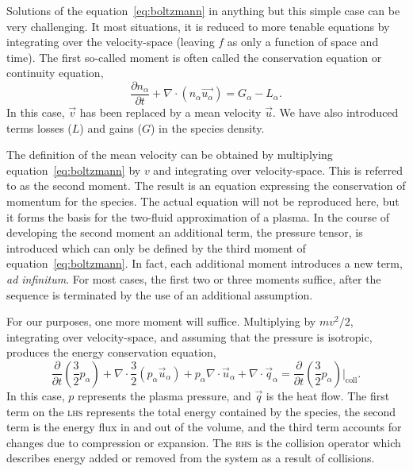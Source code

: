 Solutions of the equation~\ref{eq:boltzmann} in anything but this simple
case can be very challenging. It most situations, it is reduced to more
tenable equations by integrating over the velocity-space (leaving $f$ as
only a function of space and time). The first so-called moment is often
called the conservation equation or continuity equation,
\begin{equation}\label{eq:cont}
  \frac{\partial n_\alpha}{\partial t} + \nabla \cdot (n_\alpha \vec{u_\alpha})
  = G_\alpha - L_\alpha.
\end{equation}
In this case, $\vec{v}$ has been replaced by a mean velocity $\vec{u}$.
We have also introduced terms losses ($L$) and gains ($G$) in the
species density.

The definition of the mean velocity can be obtained by multiplying
equation~\ref{eq:boltzmann} by $v$ and integrating over velocity-space.
This is referred to as the second moment. The result is an equation
expressing the conservation of momentum for the species. The actual
equation will not be reproduced here, but it forms the basis for the
two-fluid approximation of a plasma. In the course of developing the
second moment an additional term, the pressure tensor, is introduced
which can only be defined by the third moment of
equation~\ref{eq:boltzmann}. In fact, each additional moment introduces
a new term, \emph{ad infinitum}. For most cases, the first two or three
moments suffice, after the sequence is terminated by the use of an
additional assumption.

For our purposes, one more moment will suffice. Multiplying by $mv^2/2$,
integrating over velocity-space, and assuming that the pressure is
isotropic, produces the energy conservation equation,
\begin{equation}
  \frac{\partial}{\partial t}\left(\frac{3}{2}p_\alpha\right) 
  + \nabla\cdot\frac{3}{2} (p_\alpha\vec{u}_\alpha)
  + p_\alpha\nabla\cdot\vec{u}_\alpha
  + \nabla\cdot\vec{q}_\alpha
  = \frac{\partial}{\partial
  t}\left(\frac{3}{2}p_\alpha\right)\bigg|_\mathrm{coll}.
\end{equation}
In this case, $p$ represents the plasma pressure, and $\vec{q}$ is the
heat flow. The first term on the \textsc{lhs} represents the total
energy contained by the species, the second term is the energy flux in
and out of the volume, and the third term accounts for changes due to
compression or expansion. The \textsc{rhs} is the collision operator
which describes energy added or removed from the system as a result of
collisions.

